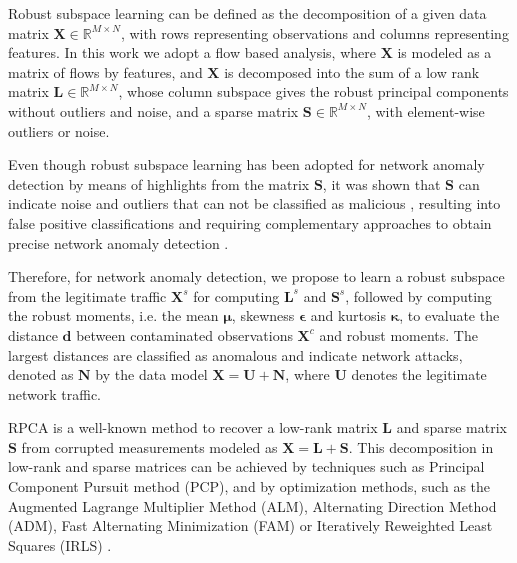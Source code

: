 \documentclass[review]{elsarticle}
\begin{document}
Robust subspace learning can be defined as the decomposition of a given data matrix $\pmb{X} \in \mathbb{R}^{M \times N}$, with rows representing observations and columns representing features. In this work we adopt a flow based analysis, where $\pmb{X}$ is modeled as a matrix of flows by features, and $\pmb{X}$ is decomposed into the sum of a low rank matrix $\pmb{L} \in \mathbb{R}^{M \times N}$, whose column subspace gives the robust principal components without outliers and noise, and a sparse matrix $\pmb{S} \in \mathbb{R}^{M \times N}$, with element-wise outliers or noise.

Even though robust subspace learning has been adopted for network anomaly detection by means of highlights from the matrix $\pmb{S}$, it was shown that $\pmb{S}$ can indicate noise and outliers that can not be classified as malicious \cite{vaswani2018robust, lerman2018overview}, resulting into false positive classifications and requiring complementary approaches to obtain precise network anomaly detection \cite{zhou2017anomaly}.

Therefore, for network anomaly detection, we propose to learn a robust subspace from the legitimate traffic $\pmb{X}^s$ for computing $\pmb{L}^s$ and $\pmb{S}^s$, followed by computing the robust moments, i.e. the mean $\pmb{\mu}$, skewness $\pmb{\epsilon}$ and kurtosis $\pmb{\kappa}$, to evaluate the distance $\pmb{d}$ between contaminated observations $\pmb{X}^c$ and robust moments. The largest distances are classified as anomalous and indicate network attacks, denoted as $\pmb{N}$ by the data model $\pmb{X} = \pmb{U} + \pmb{N}$, where $\pmb{U}$ denotes the legitimate network traffic.

RPCA is a well-known method to recover a low-rank matrix $\pmb{L}$ and sparse matrix $\pmb{S}$ from corrupted measurements modeled as $\pmb{X} = \pmb{L} + \pmb{S}$. This decomposition in low-rank and sparse matrices can be achieved by techniques such as Principal Component Pursuit method (PCP), and by optimization methods, such as the Augmented Lagrange Multiplier Method (ALM), Alternating Direction Method (ADM), Fast Alternating Minimization (FAM) or Iteratively Reweighted Least Squares (IRLS) \cite{candes2011robust,vaswani2018robust,lerman2018overview}.
\end{document}
